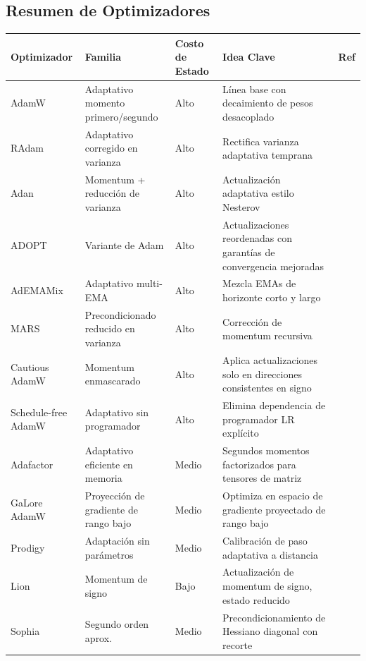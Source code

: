 \documentclass[11pt,a4paper]{article}
\begin{document}
\subsection{Resumen de Optimizadores}
\small
\begin{longtable}{p{2.2cm}p{2.8cm}p{2.0cm}p{5.4cm}p{1.8cm}}
\toprule
\textbf{Optimizador} & \textbf{Familia} & \textbf{Costo de Estado} & \textbf{Idea Clave} & \textbf{Ref} \\
\midrule
\endhead
AdamW & Adaptativo momento primero/segundo & Alto & Línea base con decaimiento de pesos desacoplado & \citep{loshchilov_decoupled_2017} \\
RAdam & Adaptativo corregido en varianza & Alto & Rectifica varianza adaptativa temprana & \citep{liu_variance_2019} \\
Adan & Momentum + reducción de varianza & Alto & Actualización adaptativa estilo Nesterov & \citep{xie_adan_2022} \\
ADOPT & Variante de Adam & Alto & Actualizaciones reordenadas con garantías de convergencia mejoradas & \citep{taniguchi_adopt_2024} \\
AdEMAMix & Adaptativo multi-EMA & Alto & Mezcla EMAs de horizonte corto y largo & \citep{pagliardini_ademamix_2024} \\
MARS & Precondicionado reducido en varianza & Alto & Corrección de momentum recursiva & \citep{yuan_mars_2024} \\
Cautious AdamW & Momentum enmascarado & Alto & Aplica actualizaciones solo en direcciones consistentes en signo & \citep{liang_cautious_2024} \\
Schedule-free AdamW & Adaptativo sin programador & Alto & Elimina dependencia de programador LR explícito & \citep{defazio_road_2024} \\
Adafactor & Adaptativo eficiente en memoria & Medio & Segundos momentos factorizados para tensores de matriz & \citep{shazeer_adafactor_2018} \\
GaLore AdamW & Proyección de gradiente de rango bajo & Medio & Optimiza en espacio de gradiente proyectado de rango bajo & \citep{zhao_galore_2024} \\
Prodigy & Adaptación sin parámetros & Medio & Calibración de paso adaptativa a distancia & \citep{mishchenko_prodigy_2023} \\
Lion & Momentum de signo & Bajo & Actualización de momentum de signo, estado reducido & \citep{chen_symbolic_2023} \\
Sophia & Segundo orden aprox. & Medio & Precondicionamiento de Hessiano diagonal con recorte & \citep{liu_sophia_2023} \\

\end{longtable}
\end{document}

